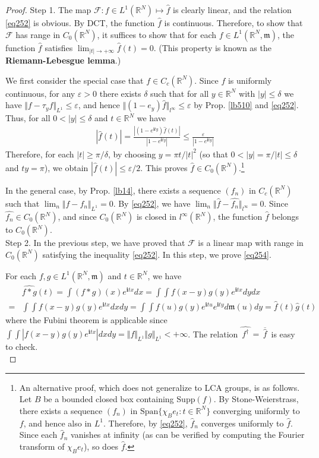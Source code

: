 \documentclass[12pt,b5paper,notitlepage]{article}
\theoremstyle{definition}
\theoremstyle{plain}
\newcommand{\wht}{\widehat}
\newcommand{\ovl}{\overline}
\newcommand{\Span}{\mathrm{Span}}
\newcommand{\im}{\mathbf{i}}
\newcommand{\Rbb}{\mathbb R}
\newcommand{\Supp}{\mathrm{Supp}}
\newcommand{\mk}{\mathfrak m}
\newcommand{\eps}{\varepsilon}
\newcommand{\MF}{\mathcal F}
\numberwithin{equation}{section}
\begin{document}
\begin{proof}
Step 1. The map $\MF:f\in L^1(\Rbb^N)\mapsto \wht f$ is clearly linear, and the relation \eqref{eq252} is obvious. By DCT, the function $\wht f$ is continuous. Therefore, to show that $\MF$ has range in $C_0(\Rbb^N)$, it suffices to show that for each $f\in L^1(\Rbb^N,\mk)$, the function $\wht f$ satisfies $\lim_{|t|\rightarrow+\infty}\wht f(t)=0$. (This property is known as the \textbf{Riemann-Lebesgue lemma}.)

We first consider the special case that $f\in C_c(\Rbb^N)$. Since $f$ is uniformly continuous, for any $\eps>0$ there exists $\delta$ such that for all $y\in\Rbb^N$ with $|y|\leq\delta$ we have $\Vert f-\tau_yf\Vert_{L^1}\leq\eps$, and hence $\Vert (1-e_y)\wht f\Vert_{l^\infty}\leq\eps$ by Prop. \ref{lb510} and \eqref{eq252}. Thus, for all $0<|y|\leq\delta$ and $t\in\Rbb^N$ we have
\begin{align*}
|\wht f(t)|=\frac{|(1-e^{\im ty})\wht f(t)|}{|1-e^{\im ty}|}\leq\frac\eps{|1-e^{\im ty}|}
\end{align*}
Therefore, for each $|t|\geq\pi/\delta$, by choosing $y=\pi t/|t|^2$ (so that $0<|y|=\pi/|t|\leq\delta$ and $ty=\pi$), we obtain $|\wht f(t)|\leq \eps/2$. This proves $\wht f\in C_0(\Rbb^N)$.\footnote{An alternative proof, which does not generalize to LCA groups, is as follows. Let $B$ be a bounded closed box containing $\Supp(f)$. By Stone-Weierstrass, there exists a sequence $(f_n)$ in $\Span\{\chi_Be_t:t\in \Rbb^N\}$ converging uniformly to $f$, and hence also in $L^1$. Therefore, by \eqref{eq252}, $\wht f_n$ converges uniformly to $\wht f$. Since each $\wht f_n$ vanishes at infinity (as can be verified by computing the Fourier transform of $\chi_B e_t$), so does $\wht f$.}

In the general case, by Prop. \ref{lb14}, there exists a sequence $(f_n)$ in $C_c(\Rbb^N)$ such that $\lim_n\Vert f-f_n\Vert_{L^1}=0$. By \eqref{eq252}, we have $\lim_n\Vert \wht f-\wht{f_n}\Vert_{l^\infty}=0$. Since $\wht{f_n}\in C_0(\Rbb^N)$, and since $C_0(\Rbb^N)$ is closed in $l^\infty(\Rbb^N)$, the function $\wht f$ belongs to $C_0(\Rbb^N)$.\\[-1ex]

Step 2. In the previous step, we have proved that $\MF$ is a linear map with range in $C_0(\Rbb^N)$ satisfying the inequality \eqref{eq252}. In this step, we prove \eqref{eq254}. 

For each $f,g\in L^1(\Rbb^N,\mk)$ and $t\in\Rbb^N$, we have
\begin{align*}
&\wht{f*g}(t)=\int (f*g)(x)e^{\im tx}dx=\int\int f(x-y)g(y)e^{\im tx}dydx\\
=&\int\int f(x-y)g(y)e^{\im tx}dxdy=\int\int f(u)g(y)e^{\im tu}e^{\im ty}d\mk(u)dy=\wht f(t)\wht g(t)
\end{align*}
where the Fubini theorem is applicable since $\int\int|f(x-y)g(y)e^{\im tx}|dxdy=\Vert f\Vert_{L^1}\Vert g\Vert_{L^1}<+\infty$. The relation $\wht{\,f^\dagger\,}=\ovl{\,\wht f\,}$ is easy to check.\\[-1ex]



\end{proof}
\end{document}

